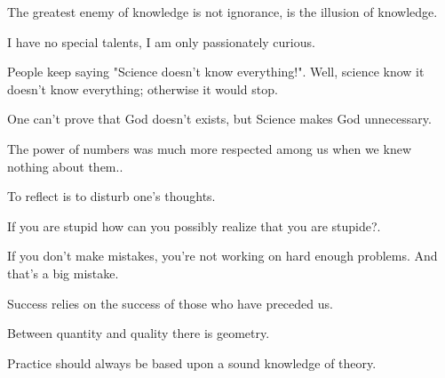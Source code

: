 \documentclass[12pt,a4paper,twoside,openright]{report}
\theoremstyle{definition}
\theoremstyle{itexmp}
\numberwithin{equation}{section}
\begin{document}
 	 \begin{fquote}The greatest enemy of knowledge is not ignorance, is the illusion of knowledge.
 	\end{fquote}
 	
 	\begin{fquote}I have no special talents, I am only passionately curious.
 	\end{fquote}

	\begin{fquote}People keep saying "Science doesn't know everything!". Well, science know it doesn't know everything; otherwise it would stop.
 	\end{fquote}


 	 \begin{fquote}One can't prove that God doesn't exists, but Science makes God unnecessary.
 	\end{fquote}

 	 \begin{fquote}[Voltaire]The power of numbers was much more respected among us when we knew nothing about them..
 	\end{fquote}

	\begin{fquote}To reflect is to disturb one's thoughts.
 	\end{fquote} 
 	
 	\begin{fquote}If you are stupid how can you possibly realize that you are stupide?.
 	\end{fquote} 	
 	
 	\begin{fquote}If you don't make mistakes, you're not working on hard enough problems. And that's a big mistake.
 	\end{fquote}

	\begin{fquote}[?]Success relies on the success of those who have preceded us.
 	\end{fquote}
 	
 	\begin{fquote}Between quantity and quality there is geometry.
 	\end{fquote}

	\begin{fquote}Practice should always be based upon a sound knowledge of theory.
 	\end{fquote}
 	
\end{document}
